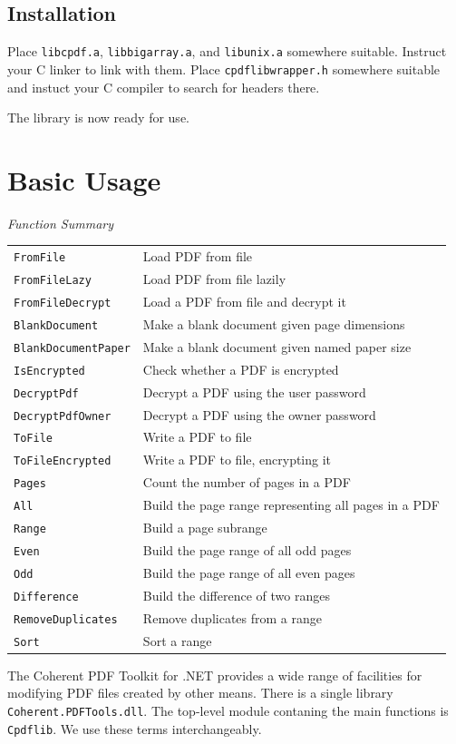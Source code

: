 \documentclass[a4paper]{memoir}
\begin{document}
\section{Installation}
Place \texttt{libcpdf.a}, \texttt{libbigarray.a}, and \texttt{libunix.a} somewhere suitable. Instruct your C linker to link with them. Place \texttt{cpdflibwrapper.h} somewhere suitable and instuct your C compiler to search for headers there.

\vspace{3mm}
\noindent The library is now ready for use.

\chapter{Basic Usage}
\begin{framed}
\noindent\textit{Function Summary}\\[2mm]
\noindent\begin{tabular}{ll}
\verb!FromFile! & Load PDF from file\\
\verb!FromFileLazy! & Load PDF from file lazily\\
\verb!FromFileDecrypt! & Load a PDF from file and decrypt it\\[5mm]
\verb!BlankDocument! & Make a blank document given page dimensions\\
\verb!BlankDocumentPaper! & Make a blank document given named paper size\\[5mm]
\verb!IsEncrypted! & Check whether a PDF is encrypted\\
\verb!DecryptPdf! & Decrypt a PDF using the user password\\
\verb!DecryptPdfOwner! & Decrypt a PDF using the owner password\\[5mm]
\verb!ToFile! & Write a PDF to file\\
\verb!ToFileEncrypted! & Write a PDF to file, encrypting it\\[5mm]
\verb!Pages! & Count the number of pages in a PDF\\[5mm]
\verb!All! & Build the page range representing all pages in a PDF\\
\verb!Range! & Build a page subrange\\
\verb!Even! & Build the page range of all odd pages\\
\verb!Odd! & Build the page range of all even pages\\
\verb!Difference! & Build the difference of two ranges\\
\verb!RemoveDuplicates! & Remove duplicates from a range\\
\verb!Sort! & Sort a range
\end{tabular}
\end{framed}
The Coherent PDF Toolkit for .NET provides a wide range of facilities for
modifying PDF files created by other means. There is a single library
\texttt{Coherent.PDFTools.dll}. The top-level module contaning the main functions is \texttt{Cpdflib}. We use these terms interchangeably.
\end{document}
